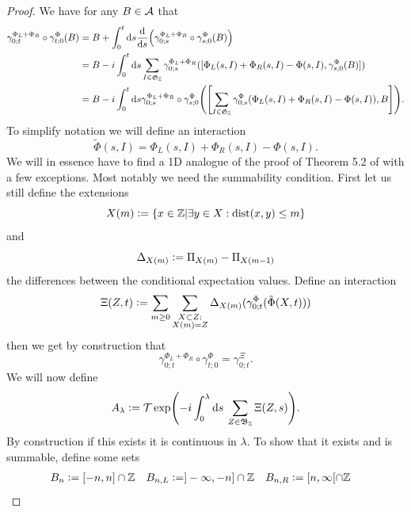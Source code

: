 \documentclass[12pt,a4paper,twoside]{article}
\numberwithin{equation}{section}
\begin{document}
\begin{proof}
	We have for any $B\in\AA$ that
	\begin{align}
		\gamma^{\Phi_L+\Phi_R}_{0;t}\circ\gamma^\Phi_{t;0}(B)&=B+\int_{0}^{t}\d s\frac{\d}{\d s}\left(\gamma^{\Phi_L+\Phi_R}_{0;s}\circ\gamma^\Phi_{s;0}(B)\right)\\
		&=B-i\int_{0}^{t}\d s\sum_{I\in\mathfrak{G}_\ZZ}\gamma^{\Phi_L+\Phi_R}_{0;s}([\Phi_L(s,I)+\Phi_R(s,I)-\Phi(s,I),\gamma^{\Phi}_{s;0}(B)])\\
		\label{eq:EquationShowingBounded_H}
		&=B-i\int_{0}^{t}\d s\gamma^{\Phi_L+\Phi_R}_{0;s}\circ\gamma^{\Phi}_{s;0}\left(\left[\sum_{I\in\mathfrak{G}_\ZZ}\gamma^{\Phi}_{0;s}(\Phi_L(s,I)+\Phi_R(s,I)-\Phi(s,I)),B\right]\right).
	\end{align}
	To simplify notation we will define an interaction
	\begin{equation}
		\tilde\Phi(s,I)=\Phi_L(s,I)+\Phi_R(s,I)-\Phi(s,I).
	\end{equation}
	We will in essence have to find a 1D analogue of the proof of Theorem 5.2 of \cite{ogata2021h3gmathbb} with a few exceptions. Most notably we need the summability condition. First let us still define the extensions
	\begin{equation}
		X(m)\defeq \{x\in\ZZ|\exists y\in X:\textrm{dist}(x,y)\leq m\}
	\end{equation}
	and
	\begin{equation}
		\Delta_{X(m)}\defeq \Pi_{X(m)}-\Pi_{X(m-1)}
	\end{equation}
	the differences between the conditional expectation values. Define an interaction
	\begin{equation}\label{eq:RecastingTheInteraction}
		\Xi(Z,t)\defeq\sum_{m\geq 0}\sum_{\substack{X\subset Z:\\X(m)=Z}}\Delta_{X(m)}(\gamma^{\Phi}_{0;t}(\tilde{\Phi}(X,t)))
	\end{equation}
	then we get by construction that
	\begin{equation}
		\gamma^{\Phi_L+\Phi_R}_{0;t}\circ\gamma^{\Phi}_{t;0}=\gamma^{\Xi}_{0;t}.
	\end{equation}
	We will now define
	\begin{equation}
		A_\lambda\defeq \mathcal{T}\exp(-i\int_0^\lambda \d s\: \sum_{Z\in\mathfrak{B}_{\ZZ}}\Xi(Z,s)).
	\end{equation}
	By construction if this exists it is continuous in $\lambda$. To show that it exists and is summable, define some sets
	\begin{align}
		B_n&\defeq [-n,n]\cap\ZZ&B_{n,L}&\defeq ]-\infty,-n]\cap\ZZ&B_{n,R}&\defeq[n,\infty[\cap\ZZ

\end{align}
\end{proof}
\end{document}
